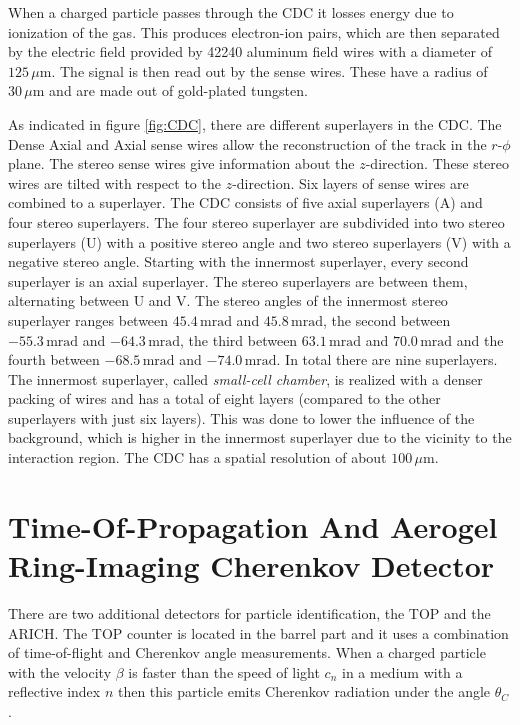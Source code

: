 \documentclass[a4paper,11pt,twosided,final,german,openbib,pdftex,listof=totoc,bibliography=totoc]{scrbook}
\begin{document}
When a charged particle passes through the CDC it losses energy due to ionization of the gas. This produces electron-ion pairs, which are then separated by the electric field provided by 42240 aluminum field wires with a diameter of $125\,\mu\textrm{m}$. The signal is then read out by the sense wires. These have a radius of $30\,\mu\textrm{m}$ and are made out of gold-plated tungsten.\cite{B2TR} 

As indicated in figure \ref{fig:CDC}, there are different superlayers in the CDC. The Dense Axial and Axial sense wires allow the reconstruction of the track in the $r$-$\phi$ plane. The stereo sense wires give information about the $z$-direction. These stereo wires are tilted with respect to the $z$-direction. Six layers of sense wires are combined to a superlayer. The CDC consists of five axial superlayers (A) and four stereo superlayers. The four stereo superlayer are subdivided into two stereo superlayers (U) with a positive stereo angle and two stereo superlayers (V) with a negative stereo angle. Starting with the innermost superlayer, every second superlayer is an axial superlayer. The stereo superlayers are between them, alternating between U and V. The stereo angles of the innermost stereo superlayer ranges between $45.4\,\textrm{mrad}$ and $45.8\,\textrm{mrad}$, the second between $-55.3\,\textrm{mrad}$ and $-64.3\,\textrm{mrad}$, the third between $63.1\,\textrm{mrad}$ and $70.0\,\textrm{mrad}$ and the fourth between $-68.5\,\textrm{mrad}$ and $-74.0\,\textrm{mrad}$. In total there are nine superlayers. The innermost superlayer, called \textit{small-cell chamber}, is realized with a denser packing of wires and has a total of eight layers (compared to the other superlayers with just six layers). This was done to lower the influence of the background, which is higher in the innermost superlayer due to the vicinity to the interaction region.
The CDC has a spatial resolution of about $100\,\mu\textrm{m}$.\cite{B2TR}

\section{Time-Of-Propagation And Aerogel Ring-Imaging Cherenkov Detector}
\label{sec:ARTO}

There are two additional detectors for particle identification, the TOP and the ARICH. The TOP counter is located in the barrel part and it uses a combination of time-of-flight and Cherenkov angle measurements.
When a charged particle with the velocity $\beta$ is faster than the speed of light $c_n$ in a medium with a reflective index $n$ then this particle emits Cherenkov radiation under the angle $\theta_{C} $.\cite{cerenkovAngle}
\end{document}
